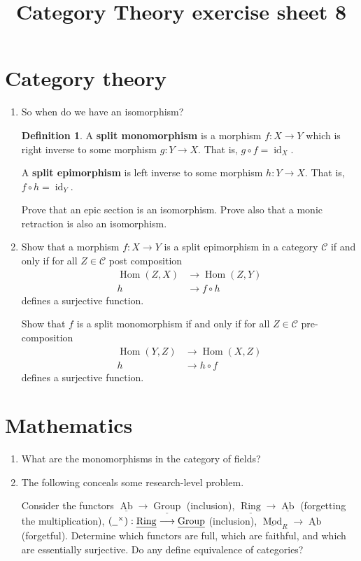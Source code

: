\documentclass[12pt]{article}
\title{Category Theory exercise sheet 8}
\theoremstyle{plain}
\theoremstyle{definition}
\newtheorem{defn}[thm]{Definition} %
\newcommand{\scr}[1]{\mathscr{#1}}
\newcommand{\und}[1]{\underline{\hspace{#1 cm}}}
\newcommand{\lto}{\longrightarrow}
\begin{document}
	
	\maketitle
	
	\section{Category theory}
	\begin{enumerate}
		\item So when do we have an isomorphism?
		\begin{defn}
			A \textbf{split monomorphism} is a morphism $f: X \lto Y$ which is right inverse to some morphism $g: Y \lto X$. That is, $g \circ f = \operatorname{id}_X$.
			
			A \textbf{split epimorphism} is left inverse to some morphism $h: Y \lto X$. That is, $f \circ h = \operatorname{id}_{Y}$.
			\end{defn}
		
		Prove that an epic section is an isomorphism. Prove also that a monic retraction is also an isomorphism.
		
		\item Show that a morphism $f: X \lto Y$ is a split epimorphism in a category $\scr{C}$ if and only if for all $Z \in \scr{C}$ post composition
		\begin{align*}
			\operatorname{Hom}(Z, X) &\lto \operatorname{Hom}(Z, Y)\\
			h &\lto f \circ h
			\end{align*}
		defines a surjective function.
		
		Show that $f$ is a split monomorphism if and only if for all $Z \in \scr{C}$ pre-composition
		\begin{align*}
			\operatorname{Hom}(Y, Z) &\lto \operatorname{Hom}(X, Z)\\
			h &\lto h \circ f
			\end{align*}
		defines a surjective function.
		\end{enumerate}
	
	\section{Mathematics}
	\begin{enumerate}
	\item What are the monomorphisms in the category of fields?
	
	\item The following conceals some research-level problem.
	
	Consider the functors $\underline{\operatorname{Ab}} \lto \underline{\operatorname{Group}}$ (inclusion), $\underline{\operatorname{Ring}} \lto \underline{\operatorname{Ab}}$ (forgetting the multiplication), $(\und{0.2}^{\times}): \underline{\operatorname{Ring}} \lto \underline{\operatorname{Group}}$ (inclusion), $\underline{\operatorname{Mod}}_R \lto \underline{\operatorname{Ab}}$ (forgetful). Determine which functors are full, which are faithful, and which are essentially surjective. Do any define equivalence of categories?
	\end{enumerate}
\end{document}
